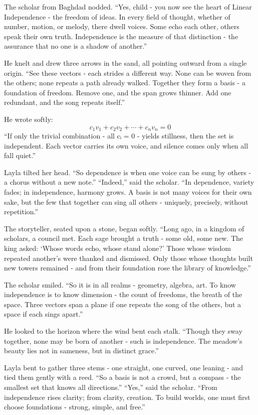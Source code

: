 \documentclass[
  letterpaper,
  DIV=11,
  numbers=noendperiod]{scrreprt}
\begin{document}
The scholar from Baghdad nodded. ``Yes, child - you now see the heart of
Linear Independence - the freedom of ideas. In every field of thought,
whether of number, motion, or melody, there dwell voices. Some echo each
other, others speak their own truth. Independence is the measure of that
distinction - the assurance that no one is a shadow of another.''

He knelt and drew three arrows in the sand, all pointing outward from a
single origin. ``See these vectors - each strides a different way. None
can be woven from the others; none repeats a path already walked.
Together they form a basis - a foundation of freedom. Remove one, and
the span grows thinner. Add one redundant, and the song repeats
itself.''

He wrote softly: \[
c_1v_1 + c_2v_2 + \cdots + c_nv_n = 0
\] ``If only the trivial combination - all cᵢ = 0 - yields stillness,
then the set is independent. Each vector carries its own voice, and
silence comes only when all fall quiet.''

Layla tilted her head. ``So dependence is when one voice can be sung by
others - a chorus without a new note.'' ``Indeed,'' said the scholar.
``In dependence, variety fades; in independence, harmony grows. A basis
is not many voices for their own sake, but the few that together can
sing all others - uniquely, precisely, without repetition.''

The storyteller, seated upon a stone, began softly. ``Long ago, in a
kingdom of scholars, a council met. Each sage brought a truth - some
old, some new. The king asked: `Whose words echo, whose stand alone?'
Those whose wisdom repeated another's were thanked and dismissed. Only
those whose thoughts built new towers remained - and from their
foundation rose the library of knowledge.''

The scholar smiled. ``So it is in all realms - geometry, algebra, art.
To know independence is to know dimension - the count of freedoms, the
breath of the space. Three vectors span a plane if one repeats the song
of the others, but a space if each sings apart.''

He looked to the horizon where the wind bent each stalk. ``Though they
sway together, none may be born of another - such is independence. The
meadow's beauty lies not in sameness, but in distinct grace.''

Layla bent to gather three stems - one straight, one curved, one leaning
- and tied them gently with a reed. ``So a basis is not a crowd, but a
compass - the smallest set that knows all directions.'' ``Yes,'' said
the scholar. ``From independence rises clarity; from clarity, creation.
To build worlds, one must first choose foundations - strong, simple, and
free.''
\end{document}
